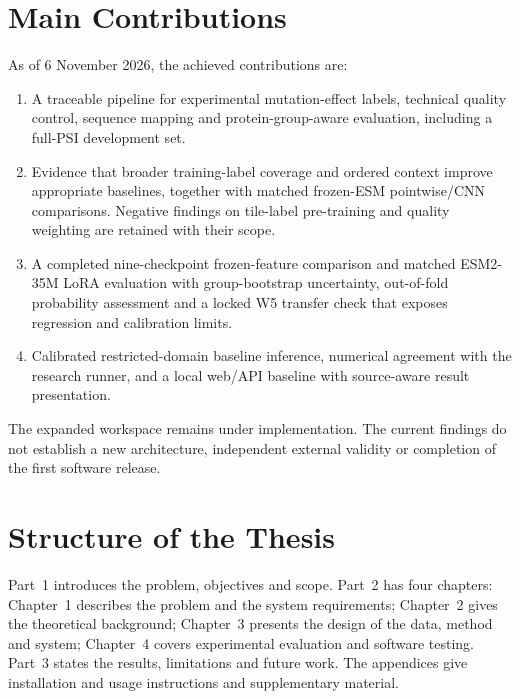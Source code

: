 \section{Main Contributions}
As of 6 November 2026, the achieved contributions are:
\begin{enumerate}
  \item A traceable pipeline for experimental mutation-effect labels, technical quality control,
        sequence mapping and protein-group-aware evaluation, including a full-PSI development set.
  \item Evidence that broader training-label coverage and ordered context improve appropriate
        baselines, together with matched frozen-ESM pointwise/CNN comparisons. Negative findings
        on tile-label pre-training and quality weighting are retained with their scope.
  \item A completed nine-checkpoint frozen-feature comparison and matched ESM2-35M LoRA
        evaluation with group-bootstrap uncertainty, out-of-fold probability assessment and a locked
        W5 transfer check that exposes regression and calibration limits.
  \item Calibrated restricted-domain baseline inference, numerical agreement with the research
        runner, and a local web/API baseline with source-aware result presentation.
\end{enumerate}
The expanded workspace remains under implementation. The current findings do not establish a new
architecture, independent external validity or completion of the first software release.

\section{Structure of the Thesis}
Part~1 introduces the problem, objectives and scope. Part~2 has four chapters: Chapter~1 describes the
problem and the system requirements; Chapter~2 gives the theoretical background; Chapter~3 presents the
design of the data, method and system; Chapter~4 covers experimental evaluation and software testing.
Part~3 states the results, limitations and future work. The appendices give installation and usage
instructions and supplementary material.
